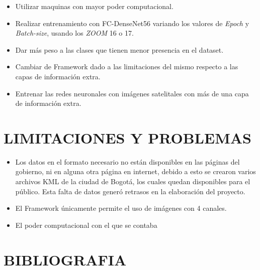 	\begin{itemize}
	
	\item Utilizar maquinas con mayor poder computacional. 

    \item Realizar entrenamiento con FC-DenseNet56 variando los valores de \textit{Epoch} y \textit{Batch-size}, usando los \textit{ZOOM} 16 o 17. 

    \item Dar más peso a las clases que tienen menor presencia en el dataset. 

    \item Cambiar de Framework dado a las limitaciones del mismo respecto a las capas de información extra. 

    \item Entrenar las redes neuronales con imágenes satelitales con más de una capa de información extra. 
	
	
	\end{itemize}
  


    
\newpage\chapter{LIMITACIONES Y PROBLEMAS} 

	\begin{itemize}
		\item Los datos en el formato necesario no están disponibles en las páginas del gobierno, ni en alguna otra página en internet, debido a esto se crearon varios archivos KML de la ciudad de Bogotá, los cuales quedan disponibles para el público. Esta falta de datos generó retrasos en la elaboración del proyecto. 

        \item{El Framework únicamente permite el uso de imágenes con 4 canales.} 

        \item{El poder computacional con el que se contaba} 	
	
	\end{itemize}
        
    
    


    
\newpage\chapter*{BIBLIOGRAFIA}

